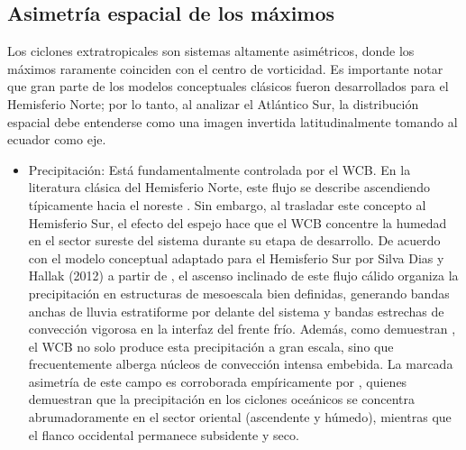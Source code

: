 \subsection{Asimetría espacial de los máximos}\label{subsec:tb_kde_asimetria}

Los ciclones extratropicales son sistemas altamente asimétricos, donde los máximos raramente coinciden con el centro de vorticidad. Es importante notar que gran parte de los modelos conceptuales clásicos fueron desarrollados para el Hemisferio Norte; por lo tanto, al analizar el Atlántico Sur, la distribución espacial debe entenderse como una imagen invertida latitudinalmente tomando al ecuador como eje.

\begin{itemize}
    \item Precipitación: Está fundamentalmente controlada por el WCB. En la literatura clásica del Hemisferio Norte, este flujo se describe ascendiendo típicamente hacia el noreste \citep{blanchard2021warm}. Sin embargo, al trasladar este concepto al Hemisferio Sur, el efecto del espejo hace que el WCB concentre la humedad en el sector sureste del sistema durante su etapa de desarrollo. De acuerdo con el modelo conceptual adaptado para el Hemisferio Sur por Silva Dias y Hallak (2012) a partir de \citet{browning1986conceptual}, el ascenso inclinado de este flujo cálido organiza la precipitación en estructuras de mesoescala bien definidas, generando bandas anchas de lluvia estratiforme por delante del sistema y bandas estrechas de convección vigorosa en la interfaz del frente frío. Además, como demuestran \citet{oertel2021warm}, el WCB no solo produce esta precipitación a gran escala, sino que frecuentemente alberga núcleos de convección intensa embebida. La marcada asimetría de este campo es corroborada empíricamente por \citet{naud2020evaluation}, quienes demuestran que la precipitación en los ciclones oceánicos se concentra abrumadoramente en el sector oriental (ascendente y húmedo), mientras que el flanco occidental permanece subsidente y seco.


\end{itemize}
